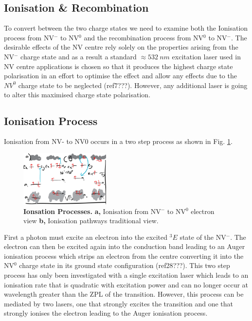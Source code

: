 \documentclass[,prl,twocolumn]{revtex4}
\begin{document}

\subsection{Ionisation \& Recombination}
To convert between the two charge states we need to examine both the Ionisation process from NV$^-$ to NV$^0$ and the recombination process from NV$^0$ to NV$^-$. The desirable effects of the NV centre rely solely on the properties arising from the NV$^-$ charge state and as a result a standard $\approx \SI{532}{nm}$ excitation laser used in NV centre applications is chosen so that it produces the highest charge state polarisation in an effort to optimise the effect and allow any effects due to the $NV^0$ charge state to be neglected (ref7???). However, any additional laser is going to alter this maximised charge state polarisation. 

\subsection{Ionisation Process}
Ionisation from NV- to NV0 occurs in a two step process as shown in Fig. \ref{FigChargeConversiona}.

\begin{figure}[H]
  \centering
  \includegraphics[width=0.4\textwidth]{ChargeConversiona.png} 
 \caption{\textbf{Ionsation Processes.} \textbf{a,} Ionisation from NV$^-$ to NV$^0$ electron view \textbf{b,} Ionisation pathways traditional view.} \label{FigChargeConversiona}
\end{figure}

First a photon must excite an electron into the excited $^3E$ state of the NV$^-$. The electron can then be excited again into the conduction band leading to an Auger ionisation process which strips an electron from the centre converting it into the NV$^0$ charge state in its ground state configuration (ref28???). This two step process has only been investigated with a single excitation laser which leads to an ionisation rate that is quadratic with excitation power and can no longer occur at wavelength greater than the ZPL of the transition. However, this process can be mediated by two lasers, one that strongly excites the transition and one that strongly ionises the electron leading to the Auger ionisation process.
\end{document}
